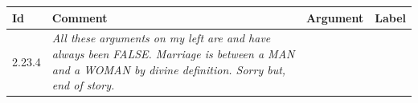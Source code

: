 \begin{table}[t!]
{\small
\begin{tabular}{@{}lp{9.5cm}p{3.5cm}c@{}}
\toprule
Id & Comment & Argument & Label \\
\midrule
2.23.4 & \normalsize{%
\textit{
All these arguments on my left are and have always been FALSE. Marriage is
between a MAN and a WOMAN by divine definition. Sorry but, end of story.
}}


\end{tabular}}
\end{table}

